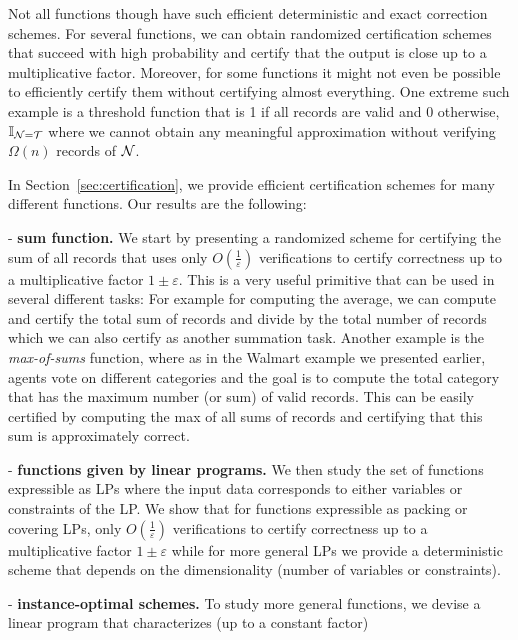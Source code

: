 Not all functions though have such efficient deterministic and exact correction schemes. For several functions, we can obtain randomized
certification schemes that succeed with high probability and certify that the output is close up to a multiplicative factor. Moreover, for some
functions it might not even be possible to efficiently certify them without certifying almost everything. One extreme such example is a threshold
function that is 1 if all records are valid and 0 otherwise, $\mathbb{I}_{\mathcal{N}=\mathcal{T}}$ where we cannot obtain any meaningful approximation
without verifying $\Omega(n)$ records of $\mathcal{N}$.

In Section~\ref{sec:certification}, we provide efficient certification schemes for many different functions. Our results are the following:
\begin{Itemize}
  \item[-] {\bf sum function.} We start by presenting a randomized scheme for certifying the sum of all records that uses only
           $O(\frac 1 \varepsilon)$ verifications to certify correctness up to a multiplicative factor $1 \pm \varepsilon$. This is a very useful
           primitive that can be used in several different tasks: For example for computing the average, we can compute and certify the total sum
           of records and divide by the total number of records which we can also certify as another summation task. Another example is the
           \emph{max-of-sums} function, where as in the Walmart example we presented earlier, agents vote on different categories and the goal is
           to compute the total category that has the maximum number (or sum) of valid records. This can be easily certified by computing the max
           of all sums of records and certifying that this sum is approximately correct.
  \item[-] {\bf functions given by linear programs.} We then study the set of functions  expressible as LPs where the input data
           corresponds to either variables or constraints of the LP. We show that for functions expressible as packing or covering LPs, only
           $O(\frac 1 \varepsilon)$ verifications to certify correctness up to a multiplicative factor $1 \pm \varepsilon$ while for more general
           LPs we provide a deterministic scheme that depends on the dimensionality (number of variables or constraints).
  \item[-] {\bf instance-optimal schemes.} To study more general functions, we devise a linear program that characterizes (up to a constant factor)

\end{Itemize}
